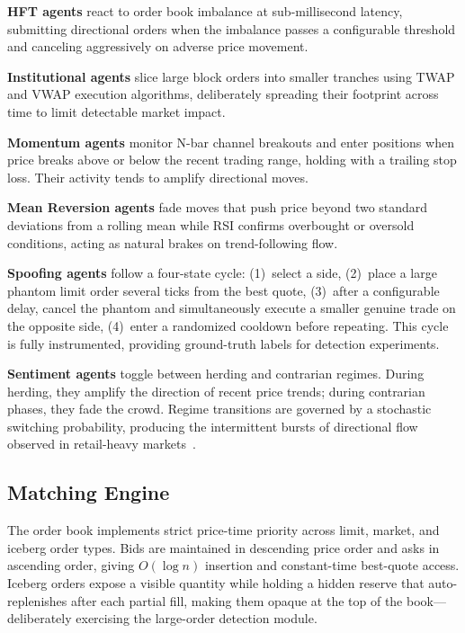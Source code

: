 \documentclass[conference]{IEEEtran}
\begin{document}
\textbf{HFT agents} react to order book imbalance at sub-millisecond
latency, submitting directional orders when the imbalance passes a
configurable threshold and canceling aggressively on adverse price
movement.

\textbf{Institutional agents} slice large block orders into smaller
tranches using TWAP and VWAP execution algorithms, deliberately
spreading their footprint across time to limit detectable market
impact.

\textbf{Momentum agents} monitor N-bar channel breakouts and enter
positions when price breaks above or below the recent trading range,
holding with a trailing stop loss. Their activity tends to amplify
directional moves.

\textbf{Mean Reversion agents} fade moves that push price beyond two
standard deviations from a rolling mean while RSI confirms overbought
or oversold conditions, acting as natural brakes on trend-following
flow.

\textbf{Spoofing agents} follow a four-state cycle: (1)~select a
side, (2)~place a large phantom limit order several ticks from the
best quote, (3)~after a configurable delay, cancel the phantom and
simultaneously execute a smaller genuine trade on the opposite side,
(4)~enter a randomized cooldown before repeating. This cycle is fully
instrumented, providing ground-truth labels for detection experiments.

\textbf{Sentiment agents} toggle between herding and contrarian
regimes. During herding, they amplify the direction of recent price
trends; during contrarian phases, they fade the crowd. Regime
transitions are governed by a stochastic switching probability,
producing the intermittent bursts of directional flow observed in
retail-heavy markets~\cite{ref14}.

\subsection{Matching Engine}

The order book implements strict price-time priority across limit,
market, and iceberg order types. Bids are maintained in descending
price order and asks in ascending order, giving $O(\log n)$ insertion
and constant-time best-quote access. Iceberg orders expose a visible
quantity while holding a hidden reserve that auto-replenishes after
each partial fill, making them opaque at the top of the
book---deliberately exercising the large-order detection module.
\end{document}
